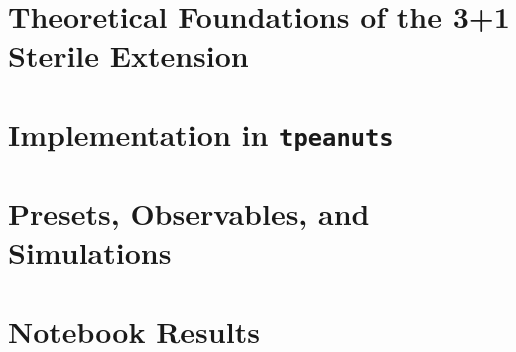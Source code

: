 \documentclass[11pt,a4paper,openany]{report}
\begin{document}
\tableofcontents
{}
\clearpage
{}

\chapter{Theoretical Foundations of the 3+1 Sterile Extension}


\chapter{Implementation in \texttt{tpeanuts}}


\chapter{Presets, Observables, and Simulations}


\chapter{Notebook Results}


\clearpage
\printbibliography[title={References}]
\end{document}
